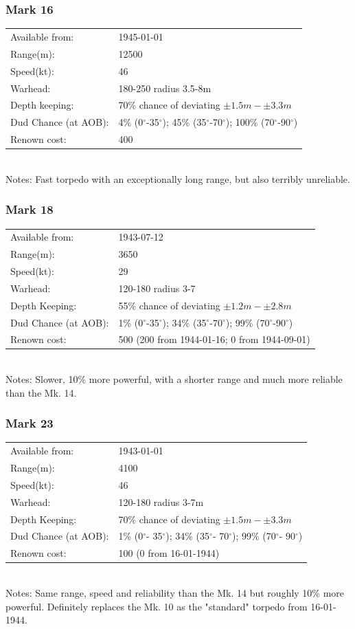 \documentclass{article}
\newcommand{\degree}{$^{\circ}$}
\begin{document}
\subsubsection{Mark 16}
\begin{tabular}{l|l}
Available from:& 1945-01-01\\
Range(m):& 12500\\
Speed(kt):&46\\
Warhead:& 180-250 radius 3.5-8m\\
Depth keeping:&  70\% chance of deviating $\pm 1.5m - \pm 3.3m$\\
Dud Chance (at AOB):& 4\% (0\degree-35\degree); 45\% (35\degree-70\degree); 100\% (70\degree-90\degree)\\
Renown cost:& 400\\
\end{tabular} \\
Notes: Fast torpedo with an exceptionally long range, but also terribly unreliable.

\subsubsection{Mark 18}
\begin{tabular}{l|l}
Available from:& 1943-07-12\\
Range(m):& 3650\\
Speed(kt):&29\\
Warhead:& 120-180 radius 3-7\\
Depth Keeping:& 55\% chance of deviating $\pm 1.2m - \pm 2.8m$\\
Dud Chance (at AOB):& 1\% (0\degree-35\degree); 34\% (35\degree-70\degree); 99\% (70\degree-90\degree)\\
Renown cost:&  500 (200 from 1944-01-16; 0 from 1944-09-01)\\
\end{tabular} \\
Notes: Slower, 10\% more powerful, with a shorter range and much more reliable than the Mk. 14.

\subsubsection{Mark 23}
\begin{tabular}{l|l}
Available from:& 1943-01-01\\
Range(m):& 4100\\
Speed(kt):&46\\
Warhead:& 120-180 radius 3-7m\\
Depth Keeping:& 70\% chance of deviating $\pm 1.5m - \pm 3.3m$\\
Dud Chance (at AOB):& 1\% (0\degree - 35\degree); 34\% (35\degree- 70\degree); 99\% (70\degree- 90\degree)\\
Renown cost:&  100 (0 from 16-01-1944)\\
\end{tabular} \\
Notes: Same range, speed and reliability than the Mk. 14 but roughly 10\% more powerful. Definitely replaces the Mk. 10 as the "standard" torpedo from 16-01-1944.
\end{document}
